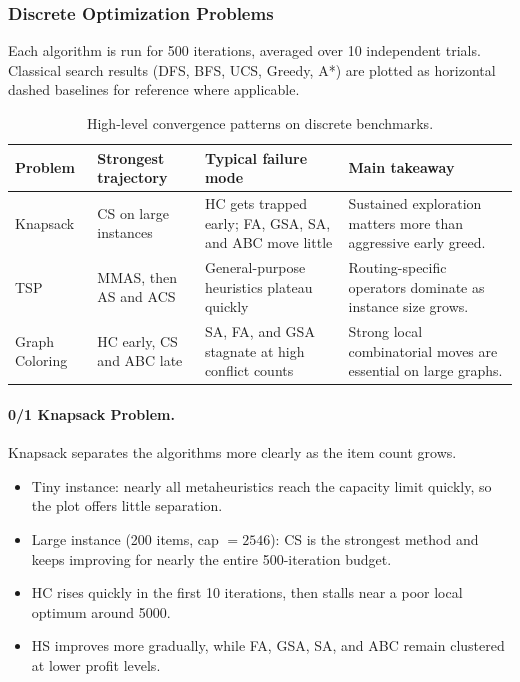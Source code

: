 \subsubsection{Discrete Optimization Problems}

Each algorithm is run for 500 iterations, averaged over 10 independent trials. Classical search results (DFS, BFS, UCS, Greedy, A*) are plotted as horizontal dashed baselines for reference where applicable.

\begin{table}[H]
    \centering
    \small
    \begin{tabular}{|p{}|p{}|p{}|p{}|}
        \hline
        \textbf{Problem} & \textbf{Strongest trajectory} & \textbf{Typical failure mode} & \textbf{Main takeaway} \\
        \hline
        Knapsack & CS on large instances & HC gets trapped early; FA, GSA, SA, and ABC move little & Sustained exploration matters more than aggressive early greed. \\
        \hline
        TSP & MMAS, then AS and ACS & General-purpose heuristics plateau quickly & Routing-specific operators dominate as instance size grows. \\
        \hline
        Graph Coloring & HC early, CS and ABC late & SA, FA, and GSA stagnate at high conflict counts & Strong local combinatorial moves are essential on large graphs. \\
        \hline
    \end{tabular}
    \caption{High-level convergence patterns on discrete benchmarks.}
    \label{tab:conv-disc-summary}
\end{table}

\paragraph{0/1 Knapsack Problem.}
Knapsack separates the algorithms more clearly as the item count grows.
\begin{itemize}
    \item Tiny instance: nearly all metaheuristics reach the capacity limit quickly, so the plot offers little separation.
    \item Large instance (200 items, cap $=2546$): CS is the strongest method and keeps improving for nearly the entire 500-iteration budget.
    \item HC rises quickly in the first 10 iterations, then stalls near a poor local optimum around 5000.
    \item HS improves more gradually, while FA, GSA, SA, and ABC remain clustered at lower profit levels.
\end{itemize}

